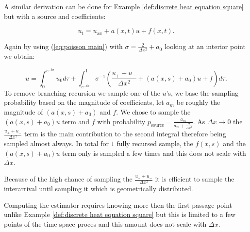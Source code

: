 \documentclass[a4paper,12pt]{article}
\begin{document}
\begin{example} \label{ex:semi heat source}

  A similar derivation can be done for Example \ref{def:discrete heat equation square}
  but with a source and coefficients:

  \begin{equation}
    u_{t} = u_{xx} + a(x,t)u + f(x,t)
    .
  \end{equation}

  Again by using (\ref{eq:poisson main}) with $\sigma = \frac{2}{\Delta x^{2}} +a_{0}$
  looking at an interior point we obtain:

  \begin{equation}
    u =
    \int_{0}^{e^{-t \sigma }} u_{0} d\tau  + \int_{e^{-t \sigma }}^{1}
    \sigma^{-1}
    \left(
    \frac{u_{+} + u_{-}}{\Delta x^{2}} +(a(x,s)+ a_{0}) u+ f
    \right)
    d\tau
    .
  \end{equation}
  To remove branching recursion we sample one of the $u$'s, we base the sampling
  probability based on the magnitude of coefficients, let $a_m$ be roughly the magnitude of
  $(a(x,s)+ a_{0})$ and $f$. We chose to sample the $(a(x,s)+ a_{0})u$ term and $f$
  with probability $p_{\text{source}} = \frac{a_m}{a_m + \frac{2}{\Delta x^{2}}}$.
  As $\Delta x \rightarrow 0$ the $\frac{u_{+} + u_{-}}{\Delta x^{2}}$ term is
  the main contribution to the second integral therefore
  being sampled almost always.
  In total for $1$ fully recursed sample,
  the $f(x,s)$ and the $(a(x,s)+ a_{0})u$ term only
  is sampled a few times and this does not scale with $\Delta x$.
\end{example}

\begin{julia}\label{jl:point estimator heat source}
  Because of the high chance of sampling the $\frac{u_{+} + u_{-}}{\Delta x^{2}}$ it is efficient
  to sample the interarrival until sampling it which is geometrically distributed.

\end{julia}

Computing the estimator requires knowing more then the first passage point
unlike Example \ref{def:discrete heat equation square} but this is limited
to a few points of the time space proces and this amount does not scale with $\Delta x$.
\end{document}
